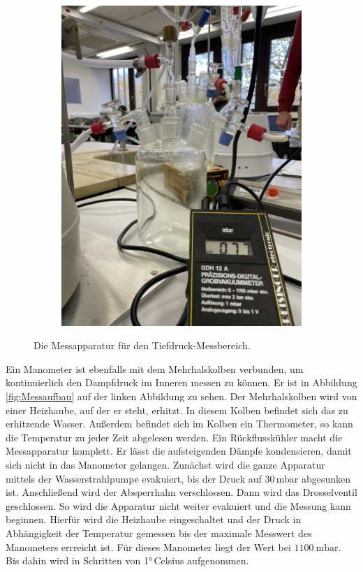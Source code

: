 \begin{figure}[H]
\begin{subfigure}{0.45\textwidth}
    \includegraphics[angle=270,scale=0.05]{content/Woulffsche_Flasche.jpeg}
    \label{Abb:Woulffsche_Flasche}
    \end{subfigure}
    \caption{Die Messapparatur für den Tiefdruck-Messbereich.}
\end{figure}\noindent
Ein Manometer ist ebenfalls mit dem Mehrhalskolben verbunden, um kontinuierlich den Dampfdruck im Inneren messen zu können.
Er ist in Abbildung \ref{fig:Messaufbau} auf der linken Abbildung zu sehen.
Der Mehrhalskolben wird von einer Heizhaube, auf der er steht, erhitzt.
In diesem Kolben befindet sich das zu erhitzende Wasser.
Außerdem befindet sich im Kolben ein Thermometer, so kann die Temperatur zu jeder Zeit abgelesen werden.
Ein Rückflusskühler macht die Messapparatur komplett.
Er lässt die aufsteigenden Dämpfe kondensieren, damit sich nicht in das Manometer gelangen.
\noindent
Zunächst wird die ganze Apparatur mittels der Wasserstrahlpumpe evakuiert, bis der Druck auf 30\,mbar abgesunken ist.
Anschließend wird der Absperrhahn verschlossen.
Dann wird das Drosselventil geschlossen.
So wird die Apparatur nicht weiter evakuiert und die Messung kann beginnen.
\noindent
Hierfür wird die Heizhaube eingeschaltet und der Druck in Abhängigkeit der Temperatur gemessen bis der maximale Messwert des Manometers errreicht ist.
Für dieses Manometer liegt der Wert bei $\SI{1100}{\milli\bar}$.
Bis dahin wird in Schritten von 1°\,Celsius aufgenommen.
